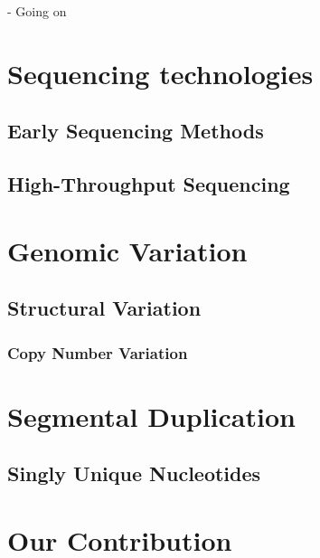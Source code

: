     - Going on

\newpage
\section{Sequencing technologies}

\subsection{Early Sequencing Methods}
\subsection{High-Throughput Sequencing}
\section{Genomic Variation}
\subsection{Structural Variation}
\subsubsection{Copy Number Variation}
\section{Segmental Duplication}
\subsection{Singly Unique Nucleotides}
\section{Our Contribution}
\newpage

